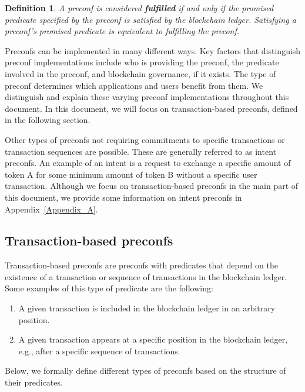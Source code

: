 \documentclass[a4paper]{article}
\theoremstyle{boldstyle}
\newtheorem{definitionx}{Definition}
\newenvironment{definition}
  {\begin{defopenboxq}\begin{definitionx}}
  {\end{definitionx}\end{defopenboxq}}
\begin{document}
     \begin{definition}\label{def:delivery}
    A preconf is considered \textbf{fulfilled }if and only if the promised predicate specified by the preconf is satisfied by the blockchain ledger. Satisfying a preconf's promised predicate is equivalent to fulfilling the preconf.
    \end{definition}


        Preconfs can be implemented in many different ways. Key factors that distinguish preconf implementations include who is providing the preconf, the predicate involved in the preconf, and blockchain governance, if it exists. The type of preconf determines which applications and users benefit from them.  We distinguish and explain these varying preconf implementations throughout this document. In this document, we will focus on transaction-based preconfs, defined in the following section. 
        
        Other types of preconfs not requiring commitments to specific transactions or transaction sequences are possible. These are generally referred to as intent preconfs. An example of an intent is a request to exchange a specific amount of token A for some minimum amount of token B without a specific user transaction. Although we focus on transaction-based preconfs in the main part of this document, we provide some information on intent preconfs in Appendix~\ref{Appendix_A}.
     
    \subsection{Transaction-based preconfs}
    \label{subsec:transaction_based}
    Transaction-based preconfs are preconfs with predicates that depend on the existence of a transaction or sequence of transactions in the blockchain ledger. Some examples of this type of predicate are the following: 
    \begin{enumerate}
        \item A given transaction is included in the blockchain ledger in an arbitrary position.
        \item A given transaction appears at a specific position in the blockchain ledger, e.g., after a specific sequence of transactions.
    \end{enumerate}
    Below, we formally define different types of preconfs based on the structure of their predicates.
\end{document}
